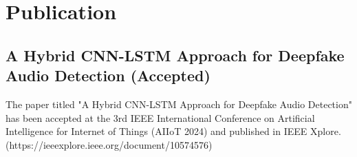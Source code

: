 \chapter{Publication}
\section{A Hybrid CNN-LSTM Approach for Deepfake Audio Detection (Accepted)}
The paper titled "A Hybrid CNN-LSTM Approach for Deepfake Audio Detection" has been accepted at the 3rd IEEE International Conference on Artificial Intelligence for Internet of Things (AIIoT 2024) and published in IEEE Xplore. (https://ieeexplore.ieee.org/document/10574576)